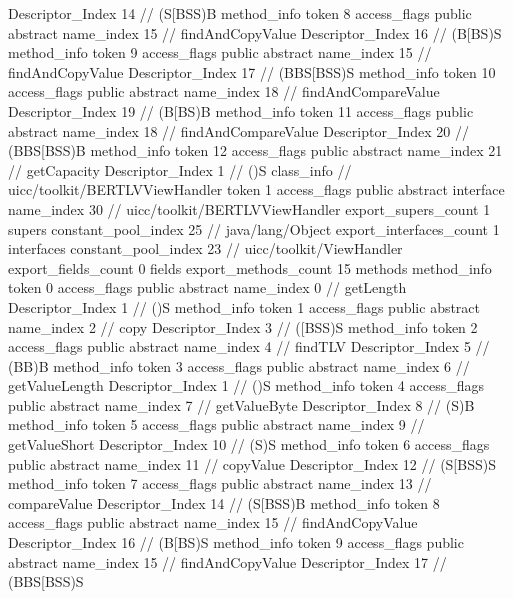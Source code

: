 {{{{{					Descriptor_Index	14		// (S[BSS)B
				}
				method_info {
					token	8
					access_flags	public abstract
					name_index	15		// findAndCopyValue
					Descriptor_Index	16		// (B[BS)S
				}
				method_info {
					token	9
					access_flags	public abstract
					name_index	15		// findAndCopyValue
					Descriptor_Index	17		// (BBS[BSS)S
				}
				method_info {
					token	10
					access_flags	public abstract
					name_index	18		// findAndCompareValue
					Descriptor_Index	19		// (B[BS)B
				}
				method_info {
					token	11
					access_flags	public abstract
					name_index	18		// findAndCompareValue
					Descriptor_Index	20		// (BBS[BSS)B
				}
				method_info {
					token	12
					access_flags	public abstract
					name_index	21		// getCapacity
					Descriptor_Index	1		// ()S
				}
			}
		}
		class_info {		// uicc/toolkit/BERTLVViewHandler
			token	1
			access_flags	public abstract interface
			name_index	30		// uicc/toolkit/BERTLVViewHandler
			export_supers_count	1
			supers {
				constant_pool_index	25		// java/lang/Object
			}
			export_interfaces_count	1
			interfaces {
				constant_pool_index	23		// uicc/toolkit/ViewHandler
			}
			export_fields_count	0
			fields {
			}
			export_methods_count	15
			methods {
				method_info {
					token	0
					access_flags	public abstract
					name_index	0		// getLength
					Descriptor_Index	1		// ()S
				}
				method_info {
					token	1
					access_flags	public abstract
					name_index	2		// copy
					Descriptor_Index	3		// ([BSS)S
				}
				method_info {
					token	2
					access_flags	public abstract
					name_index	4		// findTLV
					Descriptor_Index	5		// (BB)B
				}
				method_info {
					token	3
					access_flags	public abstract
					name_index	6		// getValueLength
					Descriptor_Index	1		// ()S
				}
				method_info {
					token	4
					access_flags	public abstract
					name_index	7		// getValueByte
					Descriptor_Index	8		// (S)B
				}
				method_info {
					token	5
					access_flags	public abstract
					name_index	9		// getValueShort
					Descriptor_Index	10		// (S)S
				}
				method_info {
					token	6
					access_flags	public abstract
					name_index	11		// copyValue
					Descriptor_Index	12		// (S[BSS)S
				}
				method_info {
					token	7
					access_flags	public abstract
					name_index	13		// compareValue
					Descriptor_Index	14		// (S[BSS)B
				}
				method_info {
					token	8
					access_flags	public abstract
					name_index	15		// findAndCopyValue
					Descriptor_Index	16		// (B[BS)S
				}
				method_info {
					token	9
					access_flags	public abstract
					name_index	15		// findAndCopyValue
					Descriptor_Index	17		// (BBS[BSS)S
}}}}}
